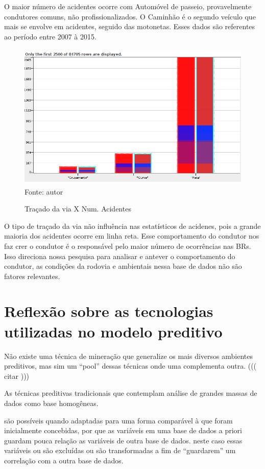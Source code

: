 O maior número de acidentes ocorre com Automóvel de passeio, provavelmente condutores comuns, não profissionalizados.
O Caminhão é o segundo veículo que mais se envolve em acidentes, seguido das motonetas. 
Esses dados são referentes ao período entre 2007 à 2015.

\begin{figure}[ht]
\begin{center}
\caption{Traçado da via X Num. Acidentes}
\includegraphics[width=120mm, height=70mm]{Figuras/Preprocess/TracadoViaNumAcident.png}\\
\tiny Fonte: autor
\end{center}
\end{figure}

O tipo de traçado da via não influência nas estatísticos de acidenes, pois a grande maioria dos acidentes ocorre em linha reta.
Esse comportamento do condutor nos faz crer o condutor é o responsável pelo maior número de ocorrências nas BRs.
Isso direciona nossa pesquisa para analisar e antever o comportamento do condutor, as condições da rodovia e ambientais nessa base
de dados não são fatores relevantes.

\pagebreak

\section{Reflexão sobre as tecnologias utilizadas no modelo preditivo}\label{result}

Não existe uma técnica de mineração que generalize os mais diversos ambientes preditivos, mas sim um ``pool'' 
dessas técnicas onde uma complementa outra. ((( citar )))

As técnicas preditivas tradicionais que contemplam análise de grandes massas de dados como base homogêneas.

são possíveis quando adaptadas para uma forma comparável à que
foram inicialmente concebidas, por que as variáveis em uma base de dados a priori guardam pouca relação as variáveis de outra base de dados.
neste caso essas variáveis ou são excluídas ou são transformadas a fim de ``guardarem'' um correlação com a outra base de dados. 


